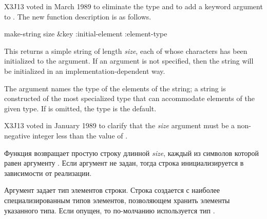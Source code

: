 \begin{newer}
X3J13 voted in March 1989 
to eliminate the type  and to add a keyword
argument  to .  The new function
description is as follows.

\begin{defun}[Function]
make-string size &key :initial-element :element-type

This returns a simple string
of length \emph{size}, each of whose characters
has been initialized to the  argument.
If an  argument is not specified, then the string will
be initialized in an implementation-dependent way.

The  argument names the type of the elements
of the string; a string is constructed of the most specialized type
that can accommodate elements of the given type.  If 
is omitted, the type  is the default.

X3J13 voted in January 1989
to clarify that the \emph{size} argument
must be a non-negative integer less than the value of
.

Функция возвращает простую строку длинной \emph{size}, каждый из символов
которой равен аргументу .
Если аргумент  не задан, тогда строка инициализируется в
зависимости от реализации.

Аргумент  задает тип элементов строки. 
Строка создается с наиболее специализированным типов элементов, позволяющем
хранить элементы указанного типа.
Если  опущен, то по-молчанию используется тип .
\end{defun}
\end{newer}

